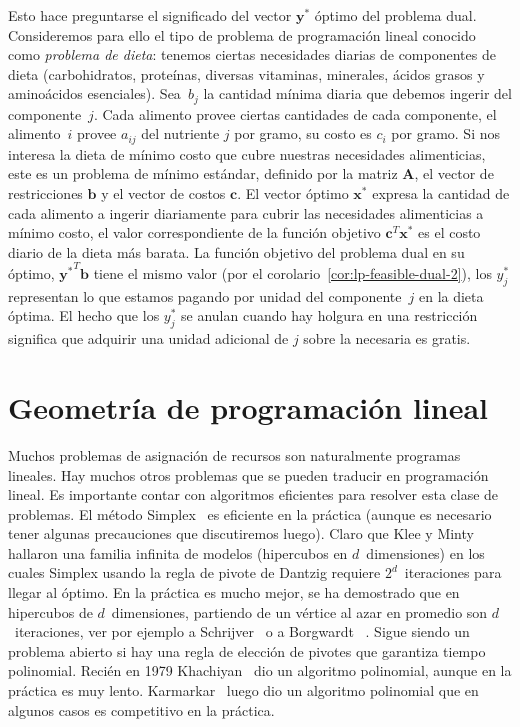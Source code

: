   Esto hace preguntarse el significado del vector \(\mathbf{y^*}\)
  óptimo del problema dual.
  Consideremos para ello el tipo de problema de programación lineal
  conocido como \emph{problema de dieta}:
  tenemos ciertas necesidades diarias de componentes de dieta
  (carbohidratos,
   proteínas,
   diversas vitaminas,
   minerales,
   ácidos grasos y aminoácidos esenciales).
  Sea~\(b_j\) la cantidad mínima diaria
  que debemos ingerir del componente~\(j\).
  Cada alimento provee ciertas cantidades de cada componente,
  el alimento~\(i\) provee \(a_{i j}\) del nutriente \(j\) por gramo,
  su costo es \(c_i\) por gramo.
  Si nos interesa la dieta de mínimo costo
  que cubre nuestras necesidades alimenticias,
  este es un problema de mínimo estándar,
  definido por la matriz \(\mathbf{A}\),
  el vector de restricciones \(\mathbf{b}\)
  y el vector de costos \(\mathbf{c}\).
  El vector óptimo \(\mathbf{x^*}\)
  expresa la cantidad de cada alimento a ingerir diariamente
  para cubrir las necesidades alimenticias a mínimo costo,
  el valor correspondiente de la función objetivo \(\mathbf{c}^T \mathbf{x^*}\)
  es el costo diario de la dieta más barata.
  La función objetivo del problema dual en su óptimo,
  \(\mathbf{y^*}^T \mathbf{b}\) tiene el mismo valor
  (por el corolario~\ref{cor:lp-feasible-dual-2}),
  los \(y_j^*\) representan
  lo que estamos pagando por unidad del componente~\(j\)
  en la dieta óptima.
  El hecho que los \(y_j^*\) se anulan cuando hay holgura en una restricción
  significa que adquirir una unidad adicional de \(j\) sobre la necesaria
  es gratis.

\section{Geometría de programación lineal}
\label{sec:geometria-programacion-lineal}

  Muchos problemas de asignación de recursos
  son naturalmente programas lineales.
  Hay muchos otros problemas que se pueden traducir en programación lineal.
  Es importante contar con algoritmos eficientes
  para resolver esta clase de problemas.
  El método Simplex~%
    \cite{dantzig47:_Simplex}
  es eficiente en la práctica
  (aunque es necesario tener algunas precauciones que discutiremos luego).
  Claro que Klee y Minty~%
    \cite{klee69:_how_good_simplex_algo}
  hallaron una familia infinita de modelos
  (hipercubos en \(d\)~dimensiones)
  en los cuales Simplex
  usando la regla de pivote de Dantzig requiere \(2^d\)~iteraciones
  para llegar al óptimo.
  En la práctica es mucho mejor,
  se ha demostrado que en hipercubos de \(d\)~dimensiones,
  partiendo de un vértice al azar en promedio son \(d\)~iteraciones,
  ver por ejemplo a Schrijver~%
    \cite{schrijver98:_theo_linear_integ_progr}
  o a Borgwardt~%
    \cite{borgwardt87:_simplex_method}.
  Sigue siendo un problema abierto si hay una regla de elección de pivotes
  que garantiza tiempo polinomial.
  Recién en 1979
  Khachiyan~%
    \cite{khachiyan79:_polynomial_algo_linear_programming}
  dio un algoritmo polinomial,
  aunque en la práctica es muy lento.
  Karmarkar~%
    \cite{karmarkar84:_new_polynomial_algorithm_linear_progr}
  luego dio un algoritmo polinomial que en algunos casos es competitivo
  en la práctica.

